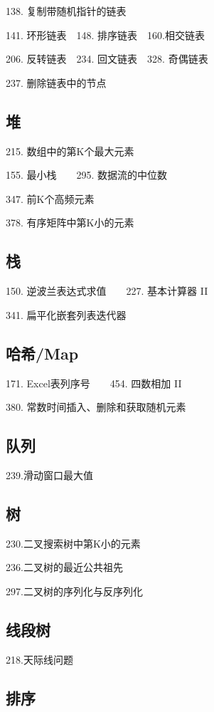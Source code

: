 \documentclass[twocolumn, a4paper, 11pt]{article}
\begin{document}
	138. 复制带随机指针的链表
	
	141. 环形链表~~148. 排序链表~~160.相交链表
	
	206. 反转链表~~234. 回文链表~~328. 奇偶链表
	
	237. 删除链表中的节点
	
	\subsection{堆}
	
	215. 数组中的第K个最大元素
	
	155. 最小栈~~~~295. 数据流的中位数
	
	347. 前K个高频元素
	
	378. 有序矩阵中第K小的元素
	
	\subsection{栈}
	
	150. 逆波兰表达式求值~~~~227. 基本计算器 II
	
	341. 扁平化嵌套列表迭代器
	
	\subsection{哈希/Map}
	
	171. Excel表列序号~~~~454. 四数相加 II
	
	380. 常数时间插入、删除和获取随机元素
	
	\subsection{队列}
	
	239.滑动窗口最大值
	
	\subsection{树}
	
	230.二叉搜索树中第K小的元素
	
	236.二叉树的最近公共祖先
	
	297.二叉树的序列化与反序列化
	
	\subsection{线段树}
	
	218.天际线问题
	
	\subsection{排序}
	
\end{document}
